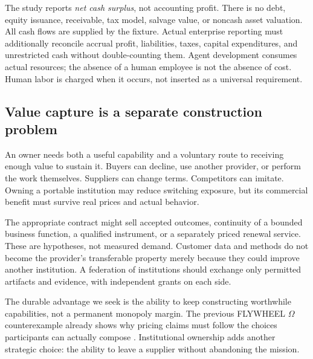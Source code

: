 The study reports \emph{net cash surplus}, not accounting profit. There is no debt, equity issuance, receivable, tax model, salvage value, or noncash asset valuation. All cash flows are supplied by the fixture. Actual enterprise reporting must additionally reconcile accrual profit, liabilities, taxes, capital expenditures, and unrestricted cash without double-counting them. Agent development consumes actual resources; the absence of a human employee is not the absence of cost. Human labor is charged when it occurs, not inserted as a universal requirement.

\subsection{Value capture is a separate construction problem}
An owner needs both a useful capability and a voluntary route to receiving enough value to sustain it. Buyers can decline, use another provider, or perform the work themselves. Suppliers can change terms. Competitors can imitate. Owning a portable institution may reduce switching exposure, but its commercial benefit must survive real prices and actual behavior.

The appropriate contract might sell accepted outcomes, continuity of a bounded business function, a qualified instrument, or a separately priced renewal service. These are hypotheses, not measured demand. Customer data and methods do not become the provider's transferable property merely because they could improve another institution. A federation of institutions should exchange only permitted artifacts and evidence, with independent grants on each side.

The durable advantage we seek is the ability to keep constructing worthwhile capabilities, not a permanent monopoly margin. The previous FLYWHEEL $\Omega$ counterexample already shows why pricing claims must follow the choices participants can actually compose \citep{boucherFlywheel}. Institutional ownership adds another strategic choice: the ability to leave a supplier without abandoning the mission.
